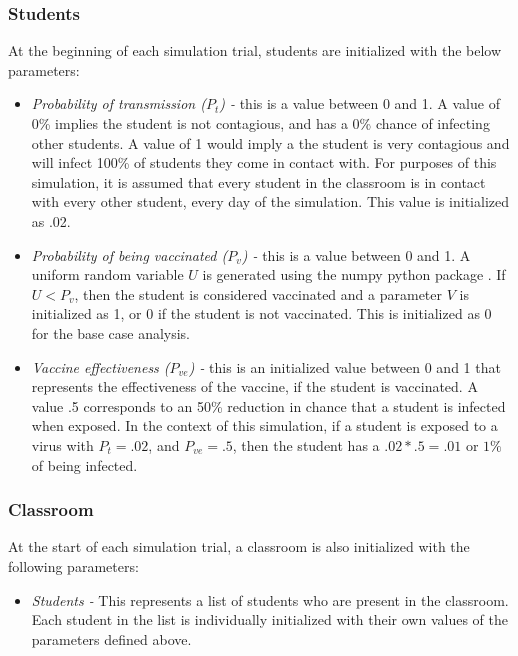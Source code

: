 \documentclass[
	letterpaper, %
]{jdf}
\begin{document}
\subsubsection{Students}
At the beginning of each simulation trial, students are initialized with the below parameters:
\begin{itemize}
\item \textit{Probability of transmission (\(P_{t}\)) -} this is a value between 0 and 1. A value of 0\% implies the student is not contagious, and has a 0\% chance of infecting other students. A value of 1 would imply a the student is very contagious and will infect 100\% of students they come in contact with. For purposes of this simulation, it is assumed that every student in the classroom is in contact with every other student, every day of the simulation. This value is initialized as .02.
\item \textit{Probability of being vaccinated (\(P_v\)) -} this is a value between 0 and 1. A uniform random variable \(U\) is generated using the numpy python package \citep{harris2020array}. If \(U <P_v\), then the student is considered vaccinated and a parameter \(V\) is initialized as 1, or 0 if the student is not vaccinated. This is initialized as 0 for the base case analysis.
\item  \textit{Vaccine effectiveness (\(P_{ve}\)) -} this is an initialized value between 0 and 1 that represents the effectiveness of the vaccine, if the student is vaccinated. A value .5 corresponds to an 50\% reduction in chance that a student is infected when exposed. In the context of this simulation, if a student is exposed to a virus with \(P_{t} = .02\), and \(P_{ve} = .5\), then the student has a \(.02*.5 = .01\) or \(1\%\) of being infected.
\end{itemize}
\subsubsection{Classroom}
At the start of each simulation trial,  a classroom is also initialized with the following parameters:

\begin{itemize}
    \item \textit{Students -} This represents a list of students who are present in the classroom. Each student in the list is individually initialized with their own values of the parameters defined above. 
\end{itemize}
\end{document}
